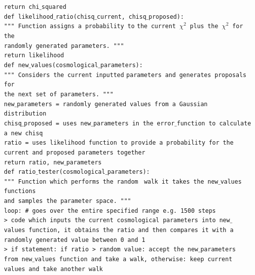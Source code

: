 \documentclass[twocolumn]{revtex4}
\begin{document}
{{{\indent\indent\indent \texttt{return chi$\_$squared} \\

\texttt{def likelihood$\_$ratio(chisq$\_$current, chisq$\_$proposed):} \\
\indent\indent\indent \texttt{""" Function assigns a probability to} 
\indent\indent\indent \texttt{the current $\chi^2$ plus the $\chi^2$ for the} \\
\indent\indent\indent \texttt{randomly generated parameters. """} \\

\indent\indent\indent \texttt{return likelihood} \\

\texttt{def new$\_$values(cosmological$\_$parameters):} \\
\indent\indent\indent \texttt{""" Considers the current inputted} 
\indent\indent\indent \texttt{parameters and generates proposals for} \\
\indent\indent\indent \texttt{the next set of parameters. """} \\

\indent\indent\indent \texttt{new$\_$parameters = randomly generated values from a Gaussian distribution} \\

\indent\indent\indent \texttt{chisq$\_$proposed = uses new$\_$parameters in the error$\_$function to calculate a new chisq} \\

\indent\indent\indent \texttt{ratio = uses likelihood function to provide a probability for the current and proposed parameters together} \\

\indent\indent\indent \texttt{return ratio, new$\_$parameters} \\

\texttt{def ratio$\_$tester(cosmological$\_$parameters):} \\
\indent\indent\indent \texttt{""" Function which performs the random } 
\indent\indent\indent \texttt{walk it takes the new$\_$values functions} \\
\indent\indent\indent \texttt{and samples the parameter space. """} \\

\indent\indent\indent \texttt{loop: \# goes over the entire specified range e.g. 1500 steps} \\
\indent\indent\indent\indent \texttt{> code which inputs the current cosmological parameters into new$\_$values function, it obtains the ratio and then compares it with a randomly generated value between 0 and 1} \\
\indent\indent\indent\indent \texttt{> if statement: if ratio > random value: accept the new$\_$parameters from new$\_$values function and take a walk, otherwise: keep current values and take another walk} \\

}}}
\end{document}
